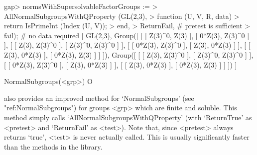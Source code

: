 \beginexample
gap> normsWithSupersolvableFactorGroups :=
> AllNormalSubgroupsWithQProperty (GL(2,3),
>    function (U, V, R, data)
>       return IsPrimeInt (Index (U, V));
>    end,
>    ReturnFail, # pretest is sufficient
>    fail); # no data required
[ GL(2,3), 
  Group([ [ [ Z(3)^0, Z(3) ], [ 0*Z(3), Z(3)^0 ] ], [ [ Z(3), Z(3)^0 ], 
          [ Z(3)^0, Z(3)^0 ] ], [ [ 0*Z(3), Z(3)^0 ], [ Z(3), 0*Z(3) ] ], 
      [ [ Z(3), 0*Z(3) ], [ 0*Z(3), Z(3) ] ] ]), 
  Group([ [ [ Z(3), Z(3)^0 ], [ Z(3)^0, Z(3)^0 ] ], 
      [ [ 0*Z(3), Z(3)^0 ], [ Z(3), 0*Z(3) ] ], 
      [ [ Z(3), 0*Z(3) ], [ 0*Z(3), Z(3) ] ] ]) ]
\endexample

\>NormalSubgroups(<grp>) O

{\CRISP} also provides an improved method for `NormalSubgroups' (see
"ref:NormalSubgroups") for groups <grp> which are finite and  soluble.
This method simply calls `AllNormalSubgroupsWithQProperty' (with `ReturnTrue'
as <pretest> and `ReturnFail' as <test>). Note that, since
<pretest> always returns `true', <test> is never actually called.
This is usually significantly faster than the methods in the {\GAP} library.


